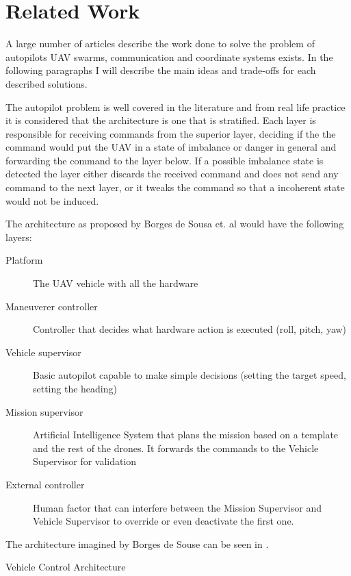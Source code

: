 \chapter{Related Work}
\label{chapter:related-work}

A large number of articles describe the work done to solve the problem of autopilots
UAV swarms, communication and coordinate systems exists. In the following paragraphs
I will describe the main ideas and trade-offs for each described solutions.

The autopilot problem is well covered in the literature and from real life practice
it is considered that the architecture is one that is stratified. Each layer
is responsible for receiving commands from the superior layer, deciding if the
the command would put the UAV in a state of imbalance or danger in general and
forwarding the command to the layer below. If a possible imbalance state is detected
the layer either discards the received command and does not send any command to 
the next layer,  or it tweaks the command so that a incoherent state would not
be induced.

The architecture as proposed by Borges de Sousa et. al \cite{pivant} would have
the following layers:

\begin{description}
\item[Platform] The UAV vehicle with all the hardware
\item[Maneuverer controller] Controller that decides what hardware action is 
executed (roll, pitch, yaw)
\item[Vehicle supervisor] Basic autopilot capable to make simple decisions 
(setting the target speed,  setting the heading)
\item[Mission supervisor] Artificial Intelligence System that plans the mission
based on a template and the rest of the drones. It forwards the commands to the
Vehicle Supervisor for validation
\item[External controller] Human factor that can interfere between the Mission
Supervisor and Vehicle Supervisor to override or even deactivate the first one.
\end{description}

The architecture imagined by Borges de Souse can be seen in .

{Vehicle Control Architecture}

